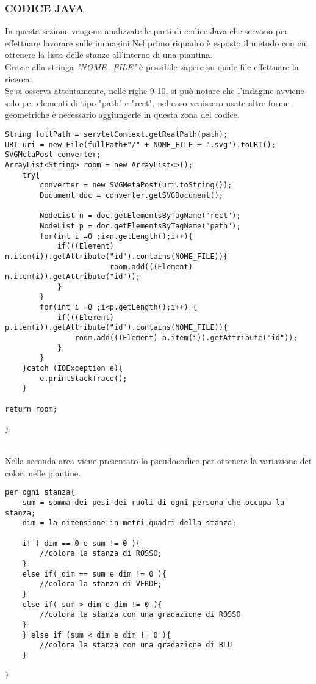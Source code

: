 \subsubsection*{CODICE JAVA}
In questa sezione vengono analizzate le parti di codice Java che servono per effettuare lavorare sulle immagini.Nel primo riquadro \`e esposto il metodo con cui ottenere la lista delle stanze all'interno di una piantina.\\Grazie alla stringa \textit{"NOME\_FILE"} \`e possibile sapere su quale file effettuare la ricerca.\\Se si osserva attentamente, nelle righe 9-10, si pu\`o notare che l'indagine avviene solo per elementi di tipo "path" e "rect", nel caso venissero usate altre forme geometriche \`e necessario aggiungerle in questa zona del codice. 
\begin{lstlisting}
String fullPath = servletContext.getRealPath(path);
URI uri = new File(fullPath+"/" + NOME_FILE + ".svg").toURI();
SVGMetaPost converter;
ArrayList<String> room = new ArrayList<>();
	try{
    	converter = new SVGMetaPost(uri.toString());
    	Document doc = converter.getSVGDocument();
    
    	NodeList n = doc.getElementsByTagName("rect");
    	NodeList p = doc.getElementsByTagName("path");
    	for(int i =0 ;i<n.getLength();i++){
    		if(((Element) n.item(i)).getAttribute("id").contains(NOME_FILE)){
            	        room.add(((Element) n.item(i)).getAttribute("id"));
			}
		}
    	for(int i =0 ;i<p.getLength();i++) {
    		if(((Element) p.item(i)).getAttribute("id").contains(NOME_FILE)){
    			room.add(((Element) p.item(i)).getAttribute("id"));
    		}
    	}
	}catch (IOException e){
		e.printStackTrace();
	}		
	
return room;

}
\end{lstlisting}
\noindent\\Nella seconda area viene presentato lo pseudocodice per ottenere la variazione dei colori nelle piantine. 
\begin{lstlisting}
per ogni stanza{
	sum = somma dei pesi dei ruoli di ogni persona che occupa la stanza;
	dim = la dimensione in metri quadri della stanza;

	if ( dim == 0 e sum != 0 ){
		//colora la stanza di ROSSO;
	}
	else if( dim == sum e dim != 0 ){
		//colora la stanza di VERDE;
	}
	else if( sum > dim e dim != 0 ){
		//colora la stanza con una gradazione di ROSSO
	}
	} else if (sum < dim e dim != 0 ){
		//colora la stanza con una gradazione di BLU
	}

}
\end{lstlisting}
